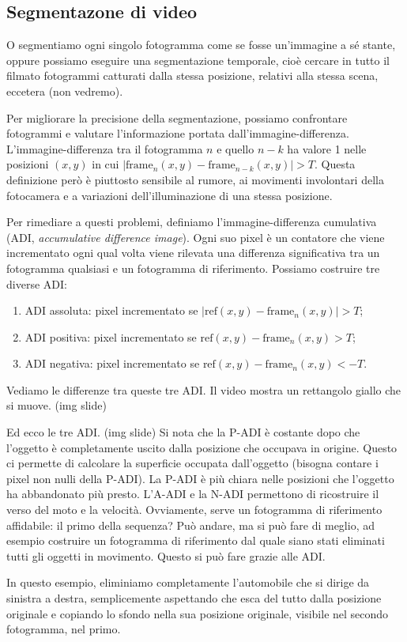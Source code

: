 \documentclass[a4paper,11pt]{article}
\begin{document}
\subsection{Segmentazone di video}
O segmentiamo ogni singolo fotogramma come se fosse un'immagine a sé stante, oppure possiamo eseguire una segmentazione temporale, cioè cercare in tutto il filmato
fotogrammi catturati dalla stessa posizione, relativi alla stessa scena, eccetera (non vedremo).
\par
Per migliorare la precisione della segmentazione, possiamo confrontare fotogrammi e valutare l'informazione portata dall'immagine-differenza.
L'immagine-differenza tra il fotogramma $n$ e quello $n-k$ ha valore 1 nelle posizioni $(x,y)$ in cui $|\text{frame}_n(x,y) - \text{frame}_{n-k}(x,y)| > T$.
Questa definizione però è piuttosto sensibile al rumore, ai movimenti involontari della fotocamera e a variazioni dell'illuminazione di una stessa posizione.
\par
Per rimediare a questi problemi, definiamo l'immagine-differenza cumulativa (ADI, \textit{accumulative difference image}). Ogni suo pixel è un contatore
che viene incrementato ogni qual volta viene rilevata una differenza significativa tra un fotogramma qualsiasi e un fotogramma di riferimento. Possiamo
costruire tre diverse ADI:
\begin{enumerate}
    \item ADI assoluta: pixel incrementato se $|\text{ref}(x,y) - \text{frame}_n(x,y)| > T$;
    \item ADI positiva: pixel incrementato se $\text{ref}(x,y) - \text{frame}_n(x,y) > T$;
    \item ADI negativa: pixel incrementato se $\text{ref}(x,y) - \text{frame}_n(x,y) < - T$.
\end{enumerate}
Vediamo le differenze tra queste tre ADI. Il video mostra un rettangolo giallo che si muove. (img slide)
\par
Ed ecco le tre ADI. (img slide)
Si nota che la P-ADI è costante dopo che l'oggetto è completamente uscito dalla posizione che occupava in origine. Questo ci permette di calcolare
la superficie occupata dall'oggetto (bisogna contare i pixel non nulli della P-ADI). La P-ADI è più chiara nelle posizioni che l'oggetto ha abbandonato più presto.
L'A-ADI e la N-ADI permettono di ricostruire il verso del moto e la velocità. Ovviamente, serve un fotogramma di riferimento affidabile: il primo della sequenza?
Può andare, ma si può fare di meglio, ad esempio costruire un fotogramma di riferimento dal quale siano stati eliminati tutti gli oggetti in movimento. Questo si può fare grazie alle ADI.
\par
In questo esempio, eliminiamo completamente l'automobile che si dirige da sinistra a destra, semplicemente aspettando che esca del tutto dalla posizione originale
e copiando lo sfondo nella sua posizione originale, visibile nel secondo fotogramma, nel primo.
\end{document}
